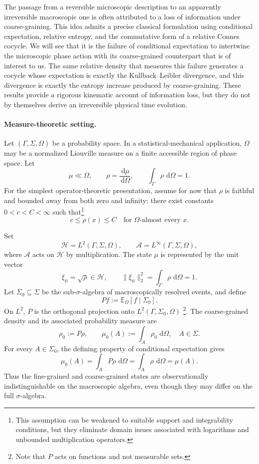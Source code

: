 \documentclass[a4paper,11pt]{article}
\theoremstyle{definition}
\newcommand{\E}{\mathbb{E}}
\newcommand{\dd}{\,\mathrm{d}}
\newcommand{\cH}{\mathcal{H}}
\newcommand{\mA}{\mathcal{A}}
\begin{document}
The passage from a reversible microscopic description to an apparently irreversible macroscopic one is often attributed to a loss of information under coarse-graining.  This idea admits a precise classical formulation using conditional expectation, relative entropy, and the commutative form of a relative Connes cocycle.  We will see that it is the failure of conditional expectation to intertwine the microscopic phase action with its coarse-grained counterpart that is of interest to us.  The same relative density that measures this failure generates a cocycle whose expectation is exactly the Kullback--Leibler divergence, and this divergence is exactly the entropy increase produced by coarse-graining.  These results provide a rigorous kinematic account of information loss, but they do not by themselves derive an irreversible physical time evolution.

\paragraph{Measure-theoretic setting.}
Let $(\Gamma,\Sigma,\Omega)$ be a probability space.  In a statistical-mechanical application, $\Omega$ may be a normalized Liouville measure on a finite accessible region of phase space.  Let
\[
  \mu\ll\Omega,
  \qquad
  \rho=\frac{\dd\mu}{\dd\Omega},
  \qquad
  \int_\Gamma \rho\,\dd\Omega=1.
\]
For the simplest operator-theoretic presentation, assume for now that $\rho$ is faithful and bounded away from both zero and infinity: there exist constants $0<c<C<\infty$ such that\footnote{This assumption can be weakened to suitable support and integrability conditions, but they eliminate domain issues associated with logarithms and unbounded multiplication operators.}
\[
  c\leq \rho(x)\leq C
  \quad\text{for $\Omega$-almost every }x.
\]


Set
\[
  \cH=L^2(\Gamma,\Sigma,\Omega),
  \qquad
  \mA=L^\infty(\Gamma,\Sigma,\Omega),
\]
where $\mA$ acts on $\cH$ by multiplication.  The state $\mu$ is represented by the unit vector
\[
  \xi_\mu=\sqrt{\rho}\in\cH,
  \qquad
  \|\xi_\mu\|_2^2=\int_\Gamma\rho\,\dd\Omega=1.
\]
Let $\Sigma_0\subseteq\Sigma$ be the sub-$\sigma$-algebra of macroscopically resolved events, and define
\[
  Pf:=\E_\Omega[f\mid\Sigma_0].
\]
On $L^2$, $P$ is the orthogonal projection onto $L^2(\Gamma,\Sigma_0,\Omega)$ \footnote{Note that $P$ acts on functions and not measurable sets.}.  The coarse-grained density and its associated probability measure are
\[
  \rho_0:=P\rho,
  \qquad
  \mu_0(A):=\int_A\rho_0\,\dd\Omega,
  \quad A\in\Sigma.
\]
For every $A\in\Sigma_0$, the defining property of conditional expectation gives
\[
  \mu_0(A)=\int_A P\rho\,\dd\Omega
  =\int_A\rho\,\dd\Omega
  =\mu(A).
\]
Thus the fine-grained and coarse-grained states are observationally indistinguishable on the macroscopic algebra, even though they may differ on the full $\sigma$-algebra.
\end{document}
